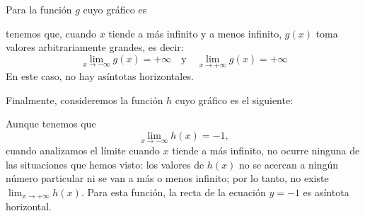 \documentclass[../teoria.root.tex]{subfiles}
\begin{document}
Para la función \(g\) cuyo gráfico es
\begin{center}
\end{center}
tenemos que, cuando \(x\) tiende a más infinito y a menos infinito, \(g(x)\) toma valores arbitrariamente grandes, es decir:
\[\lim_{x\to-\infty}g(x)=+\infty\quad\text{y}\quad\lim_{x\to+\infty}g(x)=+\infty\]
En este caso, no hay asíntotas horizontales.

Finalmente, consideremos la función \(h\) cuyo gráfico es el siguiente:
\begin{center}
\end{center}
Aunque tenemos que
\[\lim_{x\to-\infty}h(x)=-1,\]
cuando analizamos el límite cuando \(x\) tiende a más infinito, no ocurre ninguna de las situaciones que hemos visto:
los valores de \(h(x)\) no se acercan a ningún número particular ni se van a más o menos infinito;
por lo tanto, no existe \(\lim_{x\to+\infty}h(x)\).
Para esta función, la recta de la ecuación \(y=−1\) es asíntota horizontal.
\end{document}
